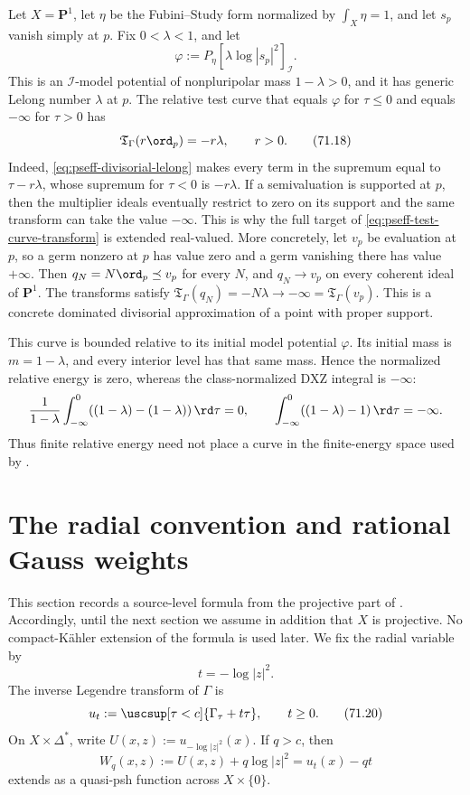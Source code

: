 \begin{example}
\label{ex:pseff-fixed-log-pole}
Let $X=\mathbf P^1$, let $\eta$ be the Fubini--Study form normalized
by $\int_X\eta=1$, and let $s_p$ vanish simply at $p$.  Fix
$0<\lambda<1$, and let
\[
 \varphi:=P_\eta[\lambda\log|s_p|^2]_{\mathcal I}.
\tag{71.17}\label{eq:pseff-log-pole-potential}
\]
This is an $\mathcal I$-model potential of nonpluripolar mass
$1-\lambda>0$, and it has generic Lelong number $\lambda$ at $p$.
The relative test curve that equals $\varphi$ for $\tau\leq0$ and
equals $-\infty$ for $\tau>0$ has
\[
 \mathfrak T_\Gamma(r\ord_p)=-r\lambda,
 \qquad r>0.
\tag{71.18}\label{eq:pseff-log-pole-transform}
\]
Indeed, \eqref{eq:pseff-divisorial-lelong} makes every term in the
supremum equal to $\tau-r\lambda$, whose supremum for $\tau<0$ is
$-r\lambda$.  If a semivaluation is supported at $p$, then the
multiplier ideals eventually restrict to zero on its support and the same
transform can take the value $-\infty$.  This is why the full target of
\eqref{eq:pseff-test-curve-transform} is extended real-valued.
More concretely, let $v_p$ be evaluation at $p$, so a germ nonzero at
$p$ has value zero and a germ vanishing there has value $+\infty$.
Then $q_N=N\ord_p\preceq v_p$ for every $N$, and $q_N\to v_p$
on every coherent ideal of $\mathbf P^1$. The transforms satisfy
$\mathfrak T_\Gamma(q_N)=-N\lambda\to-\infty
 =\mathfrak T_\Gamma(v_p)$. This is a concrete dominated divisorial
approximation of a point with proper support.

This curve is bounded relative to its initial model potential $\varphi$.
Its initial mass is $m=1-\lambda$, and every interior level has that
same mass. Hence the normalized relative energy is zero, whereas the
class-normalized DXZ integral is $-\infty$:
\[
 \frac1{1-\lambda}\int_{-\infty}^{0}
       ((1-\lambda)-(1-\lambda))\,\rd\tau=0,
 \qquad
 \int_{-\infty}^{0}((1-\lambda)-1)\,\rd\tau=-\infty.
 \label{eq:pseff-relative-energy-counterexample}
\]
Thus finite relative energy need not place a curve in the finite-energy
space used by .
\end{example}

\section{The radial convention and rational Gauss weights}
\label{sec:pseff-radial}

This section records a source-level formula from the projective part of
\cite{DXZ23}.  Accordingly, until the next section we assume in addition
that $X$ is projective.  No compact-K\"ahler extension of the formula is
used later.  We fix the radial variable by
\[
                         t=-\log|z|^2.
\tag{71.19}\label{eq:pseff-radial-convention}
\]
The inverse Legendre transform of $\Gamma$ is
\[
 u_t:=\uscsup[\tau<c]\{\Gamma_\tau+t\tau\},
 \qquad t\geq0.
\tag{71.20}\label{eq:pseff-inverse-legendre}
\]
On $X\times\Delta^*$, write
$U(x,z):=u_{-\log|z|^2}(x)$.  If $q>c$, then
\[
 W_q(x,z):=U(x,z)+q\log|z|^2
          =u_t(x)-qt
\tag{71.21}\label{eq:pseff-shifted-radial-potential}
\]
extends as a quasi-psh function across $X\times\{0\}$.

